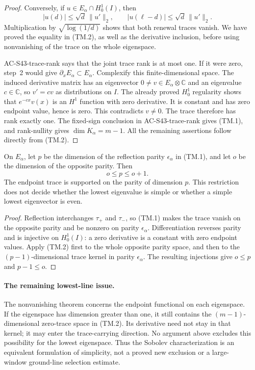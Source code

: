 \begin{proof}
Conversely, if \(u\in E_\alpha\cap H^1_0(I)\), then
\[
 |u(d)|\leq\sqrt d\,\|u'\|_2,
 \qquad |u(\ell-d)|\leq\sqrt d\,\|u'\|_2.
\]
Multiplication by \(\sqrt{\log(1/d)}\) shows that both
renewal traces vanish.  We have proved the equality in
(TM.2), as well as the derivative inclusion, before using
nonvanishing of the trace on the whole eigenspace.

AC-S43-trace-rank says that the joint trace rank is at most one.
If it were zero, step~2 would give
\(\partial_xE_\alpha\subset E_\alpha\).
Complexify this finite-dimensional space.  The induced derivative
matrix has an eigenvector \(0\ne v\in E_\alpha\otimes\mathbb C\)
and an eigenvalue \(c\in\mathbb C\), so
\(v'=cv\) as distributions on \(I\).
The already proved \(H^1_0\) regularity shows that
\(e^{-cx}v(x)\) is an \(H^1\) function with zero derivative.
It is constant and has zero endpoint value, hence is zero.
This contradicts \(v\ne0\).
The trace therefore has rank exactly one.
The fixed-sign conclusion in AC-S43-trace-rank gives (TM.1),
and rank-nullity gives \(\dim K_\alpha=m-1\).
All the remaining assertions follow directly from (TM.2).
\end{proof}

\begin{corollary}
\label{AC-S44-parity}
On \(E_\alpha\), let \(p\) be the dimension of the
reflection parity \(\epsilon_\alpha\) in (TM.1), and let
\(o\) be the dimension of the opposite parity.  Then
\[
                              o\leq p\leq o+1.          \tag{TM.6}
\]
The endpoint trace is supported on the parity of dimension \(p\).
This restriction does not decide whether the lowest eigenvalue
is simple or whether a simple lowest eigenvector is even.
\end{corollary}
\begin{proof}
Reflection interchanges \(\tau_+\) and \(\tau_-\), so
(TM.1) makes the trace vanish on the opposite parity and
be nonzero on parity \(\epsilon_\alpha\).
Differentiation reverses parity and is injective on
\(H^1_0(I)\): a zero derivative is a constant with zero
endpoint values.  Apply (TM.2) first to the whole opposite
parity space, and then to the \((p-1)\)-dimensional trace
kernel in parity \(\epsilon_\alpha\).
The resulting injections give \(o\leq p\) and \(p-1\leq o\).
\end{proof}

\paragraph{The remaining lowest-line issue.}
The nonvanishing theorem concerns the endpoint functional on
each eigenspace.  If the eigenspace has dimension greater than
one, it still contains the \((m-1)\)-dimensional zero-trace
space in (TM.2).  Its derivative need not stay in that kernel;
it may enter the trace-carrying direction.  No argument above
excludes this possibility for the lowest eigenspace.
Thus the Sobolev characterization is an equivalent formulation
of simplicity, not a proved new exclusion or a large-window
ground-line selection estimate.
